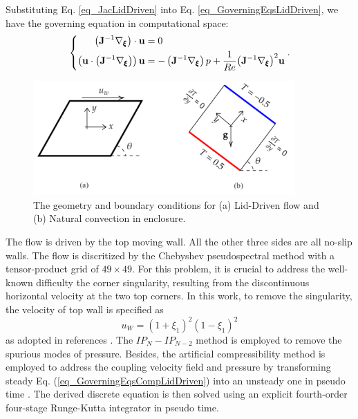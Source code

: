 \documentclass[preprint, 10pt]{elsarticle}
\begin{document}
Substituting Eq. \ref{eq_JacLidDriven} into Eq. \ref {eq_GoverningEqsLidDriven}, we have the governing equation in computational space:
\begin{equation}
\left \{
\begin{aligned}
\left(\mathbf{J}^{-1} \nabla_{\pmb {\xi}}\right)  \cdot {\bf{u}} &= 0 \\
\left( {{\bf{u}} \cdot \left(\mathbf{J}^{-1} \nabla_{\pmb {\xi}}\right) } \right){\bf{u}} &=  - \left(\mathbf{J}^{-1} \nabla_{\pmb {\xi}}\right) p + \frac{1}{Re}{\left(\mathbf{J}^{-1} \nabla_{\pmb {\xi}}\right) ^2}{\bf{u}}
\end{aligned}
\right .
.
\label{eq_GoverningEqsCompLidDriven}
\end{equation}


\begin{figure}[!ht]
    \centering
    \includegraphics[width=10cm]{..//fig/geometry.pdf}
    \caption{The geometry and boundary conditions for (a) Lid-Driven flow and (b) Natural convection in enclosure.}
    \label{fig_geometry}
\end{figure}


The flow is driven by the top moving wall. All the other three sides are all no-slip walls. The flow is discritized by the Chebyshev pseudospectral method with a tensor-product grid of $49 \times 49$.
For this problem, it is crucial to address the well-known difficulty the corner singularity, resulting from the discontinuous horizontal velocity at the two top corners. In this work, to remove the singularity, the velocity of top wall is specified as
\begin{equation}
u_W = (1+\xi_1)^2(1-\xi_1)^2
\end{equation}
as adopted in references \cite{shen1991hopf, pinelli1994chebyshev, phillips1993treatment}. The $IP_{N}-IP_{N-2}$ method \cite{zhang2010explicit, peyret2013spectral} is employed to remove the spurious modes of pressure.
Besides, the artificial compressibility method \cite{clausen2013entropically} is employed to address the coupling velocity field and pressure by  transforming steady  Eq. (\ref{eq_GoverningEqsCompLidDriven}) into an unsteady one in pseudo time . The derived discrete equation is then solved using an explicit fourth-order four-stage Runge-Kutta integrator in pseudo time.
\end{document}
